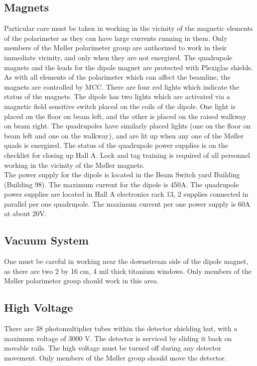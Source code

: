 \begin{safetyen}{50}{50}
\subsection{Magnets}

Particular care must be taken in working in the vicinity of the
magnetic elements of the polarimeter as they can have large currents
running in them. Only members of the M{\o}ller polarimeter group are
authorized to work in their immediate vicinity, and only when they are
not energized. The quadrupole magnets and the leads for the dipole magnet 
are protected with Plexiglas shields. As with all elements of the
polarimeter which can
affect the beamline, the magnets are controlled by MCC. There are four
red lights which indicate the status of the magnets. The dipole has two
lights which are activated via a magnetic field sensitive switch placed
on the coils of the dipole. One light is placed on the floor on beam left,
and the other is placed on the raised walkway on beam right. The quadrupoles
have similarly placed lights (one on the floor on beam left and one
on the walkway), and are lit up when any one of the M{\o}ller quads is 
energized. The status of the quadrupole power supplies is on the 
checklist for
closing up Hall A. Lock and tag training is required of all personnel working
in the vicinity of the M{\o}ller magnets. \\ 

The power supply for
the dipole is located in the Beam Switch yard Building (Building 98). 
The maximum current for the dipole is 450A.
The quadrupole power supplies are located in Hall A electronics rack 13,
2 supplies connected in parallel per one quadrupole. The maximum
current per one power supply is 60A at about 20V. 

\subsection{Vacuum System}

One must be careful in working near the downstream side of the dipole
magnet, as there are two 2 by 16 cm, 4 mil thick titanium windows.
Only members of the M{\o}ller polarimeter group should work in this
area.

\subsection{High Voltage}

There are 38 photomultiplier tubes within the detector
shielding hut, with a maximum voltage of 3000 V. The detector is serviced
by sliding it back on movable rails. The high voltage must be turned
off during any detector movement. Only members of the M{\o}ller group
should move the detector.\\


\end{safetyen}
